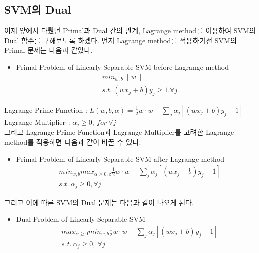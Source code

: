 \documentclass[a4paper]{oblivoir}
\begin{document}
\subsection{SVM의 Dual}
\indent 이제 앞에서 다뤘던 Primal과 Dual 간의 관계, Lagrange method를 이용하여 SVM의 Dual 함수를 구해보도록 하겠다. 먼저 Lagrange method를 적용하기전 SVM의 Primal 문제는 다음과 같았다.
\begin{itemize}\setlength\itemsep{-\parsep}
	\item Primal Problem of Linearly Separable SVM before Lagrange method
	\begin{equation}
	\begin{split}
	&min_{w,b} {\lVert w\rVert}\\
	&s.t.\ (wx_j+b)y_j\geq 1. \forall j
	\end{split}
	\end{equation}
\end{itemize}
Lagrange Prime Function : $L(w,b,\alpha)=\frac{1}{2}w\cdot w-\sum_{j}\alpha_j[(wx_j+b)y_j-1]$\\
Lagrange Multiplier : $\alpha_j\geq 0,\ for\ \forall j$\\
그리고 Lagrange Prime Function과 Lagrange Multiplier를 고려한 Lagrange method를 적용하면 다음과 같이 바꿀 수 있다.\\
\begin{itemize}\setlength\itemsep{-\parsep}
	\item Primal Problem of Linearly Separable SVM after Lagrange method
	\begin{equation}
	\begin{split}
	&min_{w,b} max_{\alpha\geq 0, \beta} \frac{1}{2}w\cdot w-\sum_{j} \alpha_j[(wx_j+b)y_j-1]\\
	&s.t.\ \alpha_j\geq0, \forall j
	\end{split}
	\label{eq:5-28}
	\end{equation}
\end{itemize}
그리고 이에 따른 SVM의 Dual 문제는 다음과 같이 나오게 된다.
\begin{itemize}\setlength\itemsep{-\parsep}
	\item Dual Problem of Linearly Separable SVM
	\begin{equation}
	\begin{split}
	&max_{\alpha\geq 0}min_{w,b} \frac{1}{2}w\cdot w-\sum_{j} \alpha_j[(wx_j+b)y_j-1]\\
	&s.t.\ \alpha_j\geq0, \ \forall j
	\end{split}
	\label{eq:5-29}
	\end{equation}
\end{itemize}
\end{document}
